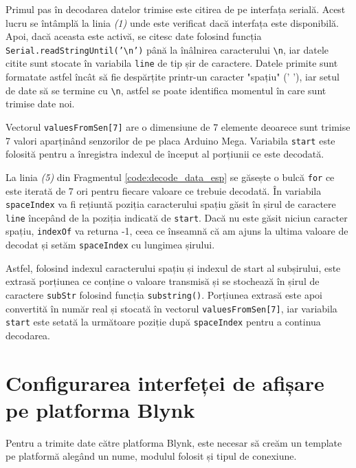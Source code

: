 Primul pas în decodarea datelor trimise este citirea de pe interfața serială. Acest lucru se întâmplă la linia \textit{(1)} unde este verificat dacă interfața este disponibilă. Apoi, dacă aceasta este activă, se citesc date folosind funcția \texttt{Serial.readStringUntil('\textbackslash n')} până la înâlnirea caracterului \texttt{\textbackslash n}, iar datele citite sunt stocate în variabila \texttt{line} de tip șir de caractere. Datele primite sunt formatate astfel încât să fie despărțite printr-un caracter "spațiu" (' '), iar setul de date să se termine cu \texttt{\textbackslash n}, astfel se poate identifica momentul în care sunt trimise date noi.

Vectorul \texttt{valuesFromSen[7]} are o dimensiune de 7 elemente deoarece sunt trimise 7 valori aparținând senzorilor de pe placa Arduino Mega. Variabila \texttt{start} este folosită pentru a înregistra indexul de început al porțiunii ce este decodată.

La linia \textit{(5)} din Fragmentul \ref{code:decode_data_esp} se găsește o bulcă \texttt{for} ce este iterată de 7 ori pentru fiecare valoare ce trebuie decodată. În variabila \texttt{spaceIndex} va fi rețiuntă poziția caracterului spațiu găsit în șirul de caractere \texttt{line} începând de la poziția indicată de \texttt{start}. Dacă nu este găsit niciun caracter spațiu, \texttt{indexOf} va returna -1, ceea ce înseamnă că am ajuns la ultima valoare de decodat și setăm \texttt{spaceIndex} cu lungimea șirului.

Astfel, folosind indexul caracterului spațiu și indexul de start al subșirului, este extrasă porțiunea ce conține o valoare transmisă și se stochează în șirul de caractere \texttt{subStr} folosind funcția \texttt{substring()}. Porțiunea extrasă este apoi convertită în număr real și stocată în vectorul \texttt{valuesFromSen[7]}, iar variabila \texttt{start} este setată la următoare poziție după \texttt{spaceIndex} pentru a continua decodarea.

\section{Configurarea interfeței de afișare pe platforma Blynk}
\label{configurare_blynk}
Pentru a trimite date către platforma Blynk, este necesar să creăm un template pe platformă alegând un nume, modulul folosit și tipul de conexiune.

